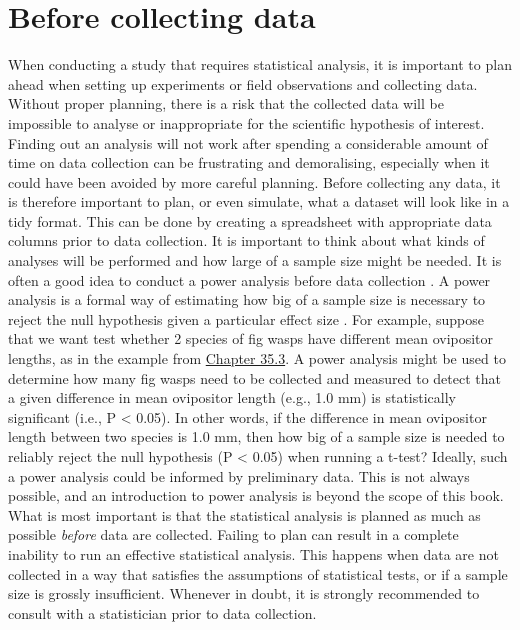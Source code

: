 \documentclass[
]{scrbook}
\begin{document}
\hypertarget{before-collecting-data}{%
\section{Before collecting data}\label{before-collecting-data}}

When conducting a study that requires statistical analysis, it is important to plan ahead when setting up experiments or field observations and collecting data.
Without proper planning, there is a risk that the collected data will be impossible to analyse or inappropriate for the scientific hypothesis of interest.
Finding out an analysis will not work after spending a considerable amount of time on data collection can be frustrating and demoralising, especially when it could have been avoided by more careful planning.
Before collecting any data, it is therefore important to plan, or even simulate, what a dataset will look like in a tidy format.
This can be done by creating a spreadsheet with appropriate data columns prior to data collection.
It is important to think about what kinds of analyses will be performed and how large of a sample size might be needed.
It is often a good idea to conduct a power analysis before data collection \citep{Steidl1997}.
A power analysis is a formal way of estimating how big of a sample size is necessary to reject the null hypothesis given a particular effect size \citep{Jones2003}.
For example, suppose that we want test whether 2 species of fig wasps have different mean ovipositor lengths, as in the example from \protect\hyperlink{randomisation-for-hypothesis-testing}{Chapter 35.3}.
A power analysis might be used to determine how many fig wasps need to be collected and measured to detect that a given difference in mean ovipositor length (e.g., 1.0 mm) is statistically significant (i.e., P \textless{} 0.05).
In other words, if the difference in mean ovipositor length between two species is 1.0 mm, then how big of a sample size is needed to reliably reject the null hypothesis (P \textless{} 0.05) when running a t-test?
Ideally, such a power analysis could be informed by preliminary data.
This is not always possible, and an introduction to power analysis is beyond the scope of this book.
What is most important is that the statistical analysis is planned as much as possible \emph{before} data are collected.
Failing to plan can result in a complete inability to run an effective statistical analysis.
This happens when data are not collected in a way that satisfies the assumptions of statistical tests, or if a sample size is grossly insufficient.
Whenever in doubt, it is strongly recommended to consult with a statistician prior to data collection.
\end{document}
